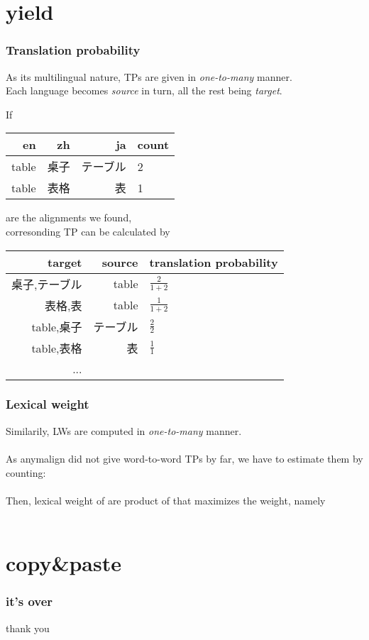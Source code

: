 \section{yield}{

  \begin{frame}
    \frametitle{Translation probability}
    As its multilingual nature, TPs are given in {\em one-to-many} manner. \\
    Each language becomes {\em source} in turn, all the rest being {\em target}.

    \vspace{0.5em}
    If
    \begin{tabular}{ r | r | r | l }
      en      & zh   & ja   & count \\
      \hline
      table & 桌子 & テーブル & 2 \\
      table & 表格 & 表 & 1 \\
    \end{tabular}
    are the alignments we found, \\
    \vspace{1em}
    corresonding TP can be calculated by \\
    \begin{tabular}{ r | r | l }
      target & source & translation probability \\
      \hline
      \small{桌子,テーブル} & table & $ \frac{2}{1+2}  $ \\
      \small{表格,表} & table & $ \frac{1}{1+2}  $ \\
      \small{table,桌子} & テーブル & $ \frac{2}{2}  $ \\
      \small{table,表格} & 表 & $ \frac{1}{1}  $ \\
      ... & & \\
    \end{tabular}
  \end{frame}

  \begin{frame}
    \frametitle{Lexical weight}
    Similarily, LWs are computed in {\em one-to-many} manner. \\

    \ \\
    As anymalign did not give word-to-word TPs by far,
    we have to estimate them by counting:  \\

    \ \\
    Then, lexical weight of
    are product of
    that maximizes the weight, namely \\
    \ \\
  \end{frame}
}

\section{copy&paste}{
\begin{frame}
  \frametitle{it's over}
  thank you
\end{frame}
}


